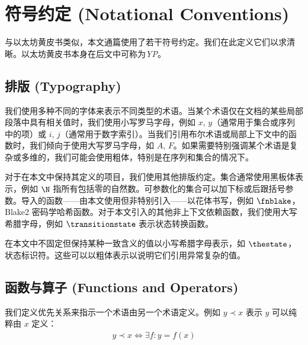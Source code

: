 \section{符号约定 (Notational Conventions)}
\label{sec:notation}

与以太坊黄皮书类似，本文通篇使用了若干符号约定。我们在此定义它们以求清晰。以太坊黄皮书本身在后文中可称为\emph{YP}。

\subsection{排版 (Typography)}\label{sec:typography}

我们使用多种不同的字体来表示不同类型的术语。当某个术语仅在文档的某些局部段落中具有相关值时，我们使用小写罗马字母，例如 $x$, $y$（通常用于集合或序列中的项）或 $i$, $j$（通常用于数字索引）。当我们引用布尔术语或局部上下文中的函数时，我们倾向于使用大写罗马字母，如 $A$, $F$。如果需要特别强调某个术语是复杂或多维的，我们可能会使用粗体，特别是在序列和集合的情况下。

对于在本文中保持其定义的项目，我们使用其他排版约定。集合通常使用黑板体表示，例如 $\N$ 指所有包括零的自然数。可参数化的集合可以加下标或后跟括号参数。导入的函数——由本文使用但非特别引入——以花体书写，例如 $\fnblake$，Blake2 密码学哈希函数。对于本文引入的其他非上下文依赖函数，我们使用大写希腊字母，例如 $\transitionstate$ 表示状态转换函数。

在本文中不固定但保持某种一致含义的值以小写希腊字母表示，如 $\thestate$，状态标识符。这些可以以粗体表示以说明它们引用异常复杂的值。

\subsection{函数与算子 (Functions and Operators)}\label{sec:functions}

我们定义优先关系来指示一个术语由另一个术语定义。例如 $y \prec x$ 表示 $y$ 可以纯粹由 $x$ 定义：
\begin{align}\label{eq:precedes}
  y \prec x \Longleftrightarrow \exists f: y = f(x)
\end{align}



